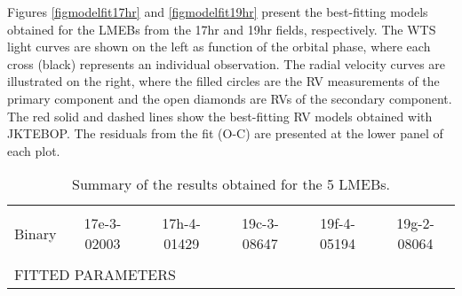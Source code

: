 \documentclass[fleqn,usenatbib]{mnras}
\begin{document}
Figures \ref{figmodelfit17hr} and \ref{figmodelfit19hr} present the best-fitting models obtained for the LMEBs from the 17hr and 19hr fields, respectively. The WTS light curves are shown on the left as function of the orbital phase, where each cross (black) represents an individual observation. The radial velocity curves are illustrated on the right, where the filled circles are the RV measurements of the primary component and the open diamonds are RVs of the secondary component. The red solid and dashed lines show the best-fitting RV models obtained with JKTEBOP. The residuals from the fit (O-C) are presented at the lower panel of each plot.


\begin{table*}
\begin{center}
\caption{Summary of the results obtained for the 5 LMEBs.%
}
\label{tab_res}
\begin{tabular}{lccccc}
\hline \hline \\ [-3ex]
Binary  & 17e-3-02003 & 17h-4-01429 & 19c-3-08647 & 19f-4-05194 & 19g-2-08064 \\
\hline\\  [-2ex]

\multicolumn{6}{l}{\scriptsize FITTED PARAMETERS}  \\


\end{tabular}
\end{center}
\end{table*}
\end{document}

